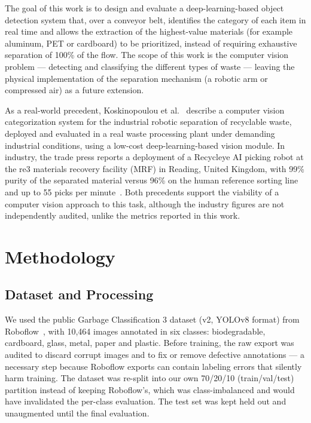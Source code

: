 \documentclass[conference]{IEEEtran}
\begin{document}
The goal of this work is to design and evaluate a deep-learning-based object detection system
that, over a conveyor belt, identifies the category of each item in real time and allows the
extraction of the highest-value materials (for example aluminum, PET or cardboard) to be
prioritized, instead of requiring exhaustive separation of 100\% of the flow. The scope of
this work is the computer vision problem --- detecting and classifying the different types of
waste --- leaving the physical implementation of the separation mechanism (a robotic arm or
compressed air) as a future extension.

As a real-world precedent, Koskinopoulou et al.~\cite{koskinopoulou2021} describe a computer
vision categorization system for the industrial robotic separation of recyclable waste,
deployed and evaluated in a real waste processing plant under demanding industrial conditions,
using a low-cost deep-learning-based vision module. In industry, the trade press reports a
deployment of a Recycleye AI picking robot at the re3 materials recovery facility (MRF) in
Reading, United Kingdom, with 99\%
purity of the separated material versus 96\% on the human reference sorting line and up to 55
picks per minute~\cite{recycleye2022}. Both precedents support the viability of a computer
vision approach to this task, although the industry figures are not independently audited,
unlike the metrics reported in this work.

\section{Methodology}

\subsection{Dataset and Processing}

We used the public Garbage Classification 3 dataset (v2, YOLOv8 format) from
Roboflow~\cite{roboflow2024}, with 10,464 images annotated in six classes: biodegradable,
cardboard, glass, metal, paper and plastic. Before training, the raw export was audited to
discard corrupt images and to fix or remove defective annotations --- a necessary step because
Roboflow exports can contain labeling errors that silently harm training. The dataset was
re-split into our own 70/20/10 (train/val/test) partition instead of keeping Roboflow's, which
was class-imbalanced and would have invalidated the per-class evaluation. The test set was
kept held out and unaugmented until the final evaluation.
\end{document}
